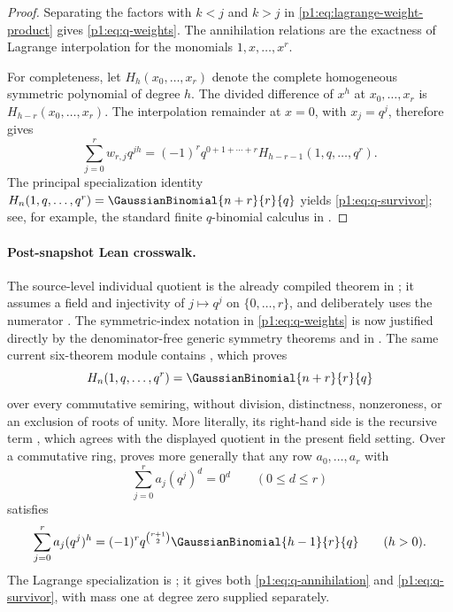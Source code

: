 \documentclass[11pt,oneside]{article}
\numberwithin{equation}{section}
\theoremstyle{definition}
\theoremstyle{remark}
\begin{document}
\begin{proof}
Separating the factors with $k<j$ and $k>j$ in
\eqref{p1:eq:lagrange-weight-product} gives \eqref{p1:eq:q-weights}.  The annihilation
relations are the exactness of Lagrange interpolation for the monomials
$1,x,\ldots,x^r$.

For completeness, let
$H_h(x_0,\ldots,x_r)$ denote the complete homogeneous symmetric polynomial of degree $h$.
The divided difference of $x^h$ at $x_0,\ldots,x_r$ is
$H_{h-r}(x_0,\ldots,x_r)$.  The interpolation remainder at $x=0$, with
$x_j=q^j$, therefore gives
\[
 \sum_{j=0}^{r}w_{r,j}q^{jh}
 =(-1)^r q^{0+1+\cdots+r}
   H_{h-r-1}(1,q,\ldots,q^r).
\]
The principal specialization identity
$H_n(1,q,\ldots,q^r)=\GaussianBinomial{n+r}{r}{q}$ yields
\eqref{p1:eq:q-survivor}; see, for example, the standard finite $q$-binomial calculus in
\cite{p1:andrews1976}.
\end{proof}

\paragraph{Post-snapshot Lean crosswalk.}
The source-level individual quotient is the already compiled theorem
 in
; it assumes a field and injectivity of
\(j\mapsto q^j\) on \(\{0,\ldots,r\}\), and deliberately uses the numerator
.  The symmetric-index notation in
\eqref{p1:eq:q-weights} is now justified directly by the denominator-free
generic symmetry theorems  and
 in
.  The same current six-theorem module
contains , which proves
\[
 H_n(1,q,\ldots,q^r)=\GaussianBinomial{n+r}{r}{q}
\]
over every commutative semiring, without division, distinctness, nonzeroness, or
an exclusion of roots of unity.  More literally, its right-hand side is the
recursive term , which agrees with the
displayed quotient in the present field setting.  Over a commutative ring,
 proves more generally that any row
\(a_0,\ldots,a_r\) with
\[
 \sum_{j=0}^{r}a_j(q^j)^d=0^d\qquad(0\le d\le r)
\]
satisfies
\[
 \sum_{j=0}^{r}a_j(q^j)^h
 =(-1)^r q^{\binom{r+1}{2}}\GaussianBinomial{h-1}{r}{q}
 \qquad(h>0).
\]
The Lagrange specialization is
; it gives both
\eqref{p1:eq:q-annihilation} and \eqref{p1:eq:q-survivor}, with mass one at degree
zero supplied separately.
\end{document}
